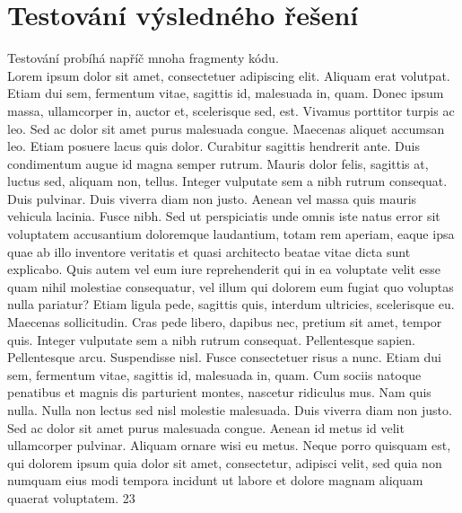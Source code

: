 \chapter{Testování výsledného řešení}
Testování probíhá napříč mnoha fragmenty kódu.\\
Lorem ipsum dolor sit amet, consectetuer adipiscing elit. Aliquam erat volutpat. Etiam dui
sem, fermentum vitae, sagittis id, malesuada in, quam. Donec ipsum massa, ullamcorper in,
auctor et, scelerisque sed, est. Vivamus porttitor turpis ac leo. Sed ac dolor sit amet purus
malesuada congue. Maecenas aliquet accumsan leo. Etiam posuere lacus quis dolor. Curabitur
sagittis hendrerit ante. Duis condimentum augue id magna semper rutrum. Mauris dolor felis,
sagittis at, luctus sed, aliquam non, tellus. Integer vulputate sem a nibh rutrum consequat. Duis
pulvinar. Duis viverra diam non justo. Aenean vel massa quis mauris vehicula lacinia.
Fusce nibh. Sed ut perspiciatis unde omnis iste natus error sit voluptatem accusantium
doloremque laudantium, totam rem aperiam, eaque ipsa quae ab illo inventore veritatis et quasi
architecto beatae vitae dicta sunt explicabo. Quis autem vel eum iure reprehenderit qui in
ea voluptate velit esse quam nihil molestiae consequatur, vel illum qui dolorem eum fugiat
quo voluptas nulla pariatur? Etiam ligula pede, sagittis quis, interdum ultricies, scelerisque eu.
Maecenas sollicitudin. Cras pede libero, dapibus nec, pretium sit amet, tempor quis. Integer
vulputate sem a nibh rutrum consequat. Pellentesque sapien. Pellentesque arcu. Suspendisse
nisl. Fusce consectetuer risus a nunc. Etiam dui sem, fermentum vitae, sagittis id, malesuada
in, quam. Cum sociis natoque penatibus et magnis dis parturient montes, nascetur ridiculus
mus. Nam quis nulla. Nulla non lectus sed nisl molestie malesuada. Duis viverra diam non justo.
Sed ac dolor sit amet purus malesuada congue. Aenean id metus id velit ullamcorper pulvinar.
Aliquam ornare wisi eu metus. Neque porro quisquam est, qui dolorem ipsum quia dolor sit
amet, consectetur, adipisci velit, sed quia non numquam eius modi tempora incidunt ut labore
et dolore magnam aliquam quaerat voluptatem.
23